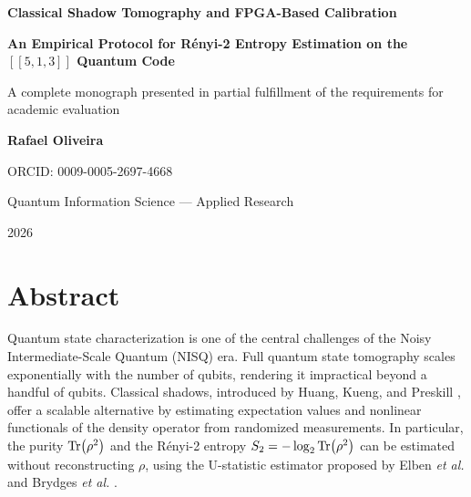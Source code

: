 \documentclass[12pt,a4paper,oneside]{book}
\theoremstyle{plain}
\theoremstyle{definition}
\theoremstyle{remark}
\begin{document}
\frontmatter

\begin{titlepage}
\centering
\vspace*{1.2cm}
{\LARGE\bfseries Classical Shadow Tomography and FPGA-Based Calibration\par}
\vspace{0.4cm}
{\LARGE\bfseries An Empirical Protocol for R\'enyi-2 Entropy Estimation on the $[[5,1,3]]$ Quantum Code\par}
\vspace{1.2cm}
{\large A complete monograph presented in partial fulfillment of the requirements for academic evaluation\par}
\vspace{2.0cm}
{\Large\textbf{Rafael Oliveira}\par}
\vspace{0.3cm}
{\large ORCID: 0009-0005-2697-4668\par}
\vspace{2.0cm}
{\large Quantum Information Science --- Applied Research\par}
\vspace{1.0cm}
{\large 2026\par}
\vfill
\end{titlepage}

\chapter*{Abstract}

Quantum state characterization is one of the central challenges of the Noisy Intermediate-Scale Quantum (NISQ) era. Full quantum state tomography scales exponentially with the number of qubits, rendering it impractical beyond a handful of qubits. Classical shadows, introduced by Huang, Kueng, and Preskill \cite{huang2020predicting}, offer a scalable alternative by estimating expectation values and nonlinear functionals of the density operator from randomized measurements. In particular, the purity $\Tr(\rho^2)$ and the R\'enyi-2 entropy $S_2 = -\log_2 \Tr(\rho^2)$ can be estimated without reconstructing $\rho$, using the U-statistic estimator proposed by Elben \textit{et al.} \cite{elben2020cross} and Brydges \textit{et al.} \cite{brydges2019probing}.
\end{document}
